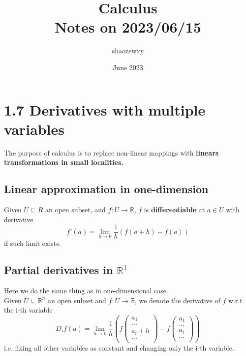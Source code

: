 \documentclass{article}
\title{Calculus\\
\large{Notes on 2023/06/15}}
\author{shaozewxy }
\date{June 2023}
\begin{document}
\maketitle
\section{1.7 Derivatives with multiple variables}
The purpose of calculus is to replace non-linear mappings with \textbf{linears transformations in small localities.}
\subsection{Linear approximation in one-dimension}
Given $U \subseteq R$ an open subset, and $f: U \rightarrow \mathbb{R}$, $f$ is \textbf{differentiable} at $a \in U$ with derivative
\begin{equation*}
    f'(a) = \lim_{h\rightarrow 0} \frac{1}{h}\left(f(a+h)-f(a)\right)
\end{equation*}
if such limit exists.
\subsection{Partial derivatives in $\mathbb{R}^1$}
Here we do the same thing as in one-dimensional case.\\
Given $U \subseteq \mathbb{R}^n$ an open subset and $f: U \rightarrow \mathbb{R}$, we denote the derivative of $f$ w.r.t the i-th variable
\begin{equation*}
    D_i f(a) = \lim_{h\rightarrow 0}\frac{1}{h}\left(
        f
            \begin{pmatrix}
                a_1\\
                ...\\
                a_i+h\\
                ...\\
            \end{pmatrix}
         -
        f
            \begin{pmatrix}
                a_1\\
                ...\\
                a_i\\
                ...\\            
            \end{pmatrix}
    \right)
\end{equation*}
i.e. fixing all other variables as constant and changing only the i-th variable.
\end{document}
